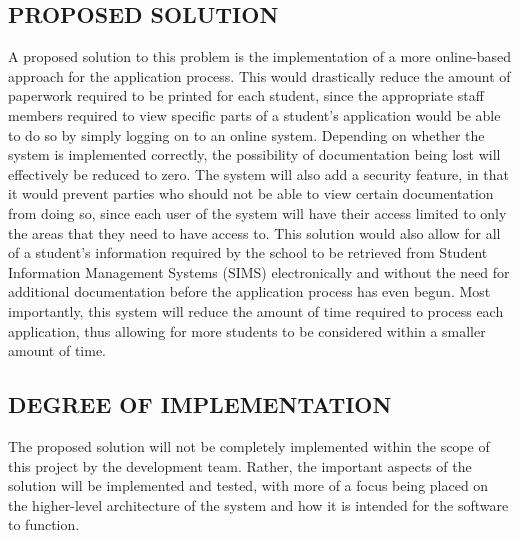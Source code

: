 \documentclass[journal,comsoc,onecolumn]{IEEEtran}
\begin{document}

\subsection{PROPOSED SOLUTION}
A proposed solution to this problem is the implementation of a more online-based approach for the application process. This would drastically reduce the amount of paperwork required to be printed for each student, since the appropriate staff members required to view specific parts of a student's application would be able to do so by simply logging on to an online system. Depending on whether the system is implemented correctly, the possibility of documentation being lost will effectively be reduced to zero. The system will also add a security feature, in that it would prevent parties who should not be able to view certain documentation from doing so, since each user of the system will have their access limited to only the areas that they need to have access to. This solution would also allow for all of a student's information required by the school to be retrieved from Student Information Management Systems (SIMS) electronically and without the need for additional documentation before the application process has even begun. Most importantly, this system will reduce the amount of time required to process each application, thus allowing for more students to be considered within a smaller amount of time.


\subsection{DEGREE OF IMPLEMENTATION}
The proposed solution will not be completely implemented within the scope of this project by the development team. Rather, the important aspects of the solution will be implemented and tested, with more of a focus being placed on the higher-level architecture of the system and how it is intended for the software to function.

\end{document}
